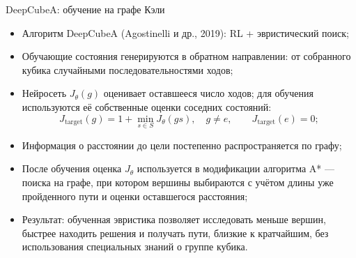 \documentclass[serif, aspectratio=169]{beamer}
\begin{document}
\begin{frame}{DeepCubeA: обучение на графе Кэли}
    \begin{itemize}
        \item Алгоритм DeepCubeA (Agostinelli и др., 2019): RL + эвристический поиск;
        \item Обучающие состояния генерируются в обратном направлении: от собранного кубика случайными последовательностями ходов;
        \item Нейросеть $J_\theta(g)$ оценивает оставшееся число ходов; для обучения используются её собственные оценки соседних состояний:
        \[J_{\mathrm{target}}(g)=1+\min_{s\in S}J_\theta(gs),\quad g\ne e,\qquad J_{\mathrm{target}}(e)=0;\]
        \item Информация о расстоянии до цели постепенно распространяется по графу;
        \item После обучения оценка $J_\theta$ используется в модификации алгоритма A* --- поиска на графе, при котором вершины выбираются с учётом длины уже пройденного пути и оценки оставшегося расстояния;
        \item Результат: обученная эвристика позволяет исследовать меньше вершин, быстрее находить решения и получать пути, близкие к кратчайшим, без использования специальных знаний о группе кубика.
    \end{itemize}
\end{frame}
\end{document}
